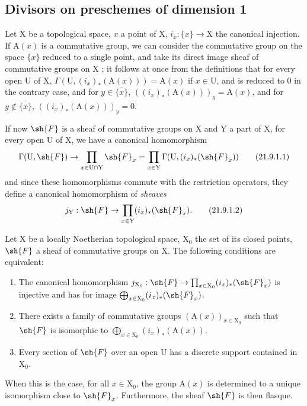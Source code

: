 \subsection{Divisors on preschemes of dimension 1}
\label{subsection:IV.21.9}

\begin{env}[21.9.1]
\label{IV.21.9.1}
Let $\mathrm{X}$ be a topological space, $x$ a point of $\mathrm{X}$, $i_x:\{x\}\to\mathrm{X}$ the canonical injection.
If $\mathrm{A}(x)$ is a commutative group, we can consider the commutative group on the space $\{x\}$ reduced to a single point, and take its direct image sheaf of commutative groups on $\mathrm{X}$ ;
it follows at once from the definitions that for every open $\mathrm{U}$ of $\mathrm{X}$, $\Gamma(\mathrm{U},(i_x)_*(\mathrm{A}(x)))=\mathrm{A}(x)$ if $x\in\mathrm{U}$, and is reduced to $0$ in the contrary case, and for $y\in\overline{\{x\}}$, $((i_x)_*(\mathrm{A}(x)))_y=\mathrm{A}(x)$, and for $y\notin\overline{\{x\}}$, $((i_x)_*(\mathrm{A}(x)))_y=0$.

If now $\sh{F}$ is a sheaf of commutative groups on $\mathrm{X}$ and $\mathrm{Y}$ a part of $\mathrm{X}$, for every open $\mathrm{U}$ of $\mathrm{X}$, we have a canonical homomorphism
\[
\label{IV.21.9.1.1}
  \Gamma(\mathrm{U},\sh{F})\to\prod_{x\in\mathrm{U}\cap\mathrm{Y}}\sh{F}_x=\prod_{x\in\mathrm{Y}}\Gamma(\mathrm{U},(i_x)_*(\sh{F}_x))
  \tag{21.9.1.1}
\]
and since these homomorphisms commute with the restriction operators, they define a canonical homomorphism of \emph{sheaves}
\[
\label{IV.21.9.1.2}
  j_\mathrm{Y}:\sh{F}\to\prod_{x\in\mathrm{Y}}(i_x)_*(\sh{F}_x).
  \tag{21.9.1.2}
\]
\end{env}

\begin{lemma}[21.9.2]
\label{IV.21.9.2}
Let $\mathrm{X}$ be a locally Noetherian topological space, $\mathrm{X}_0$ the set of its closed points, $\sh{F}$ a sheaf of commutative groups on $\mathrm{X}$.
The following conditions are equivalent:
\begin{enumerate}[label=\emph{\alph*)}]
  \item The canonical homomorphism $j_{\mathrm{X}_0}:\sh{F}\to\prod_{x\in\mathrm{X}_0}(i_x)_*(\sh{F}_x)$ is injective and has for image $\bigoplus_{x\in\mathrm{X}_0}(i_x)_*(\sh{F}_x)$.
  \item[\rm a$'$)] There exists a family of commutative groups $(\mathrm{A}(x))_{x\in\mathrm{X}_0}$ such that $\sh{F}$ is isomorphic to $\bigoplus_{x\in\mathrm{X}_0}(i_x)_*(\mathrm{A}(x))$.
  \item Every section of $\sh{F}$ over an open $\mathrm{U}$ has a discrete support contained in $\mathrm{X}_0$.
\end{enumerate}
When this is the case, for all $x\in\mathrm{X}_0$, the group $\mathrm{A}(x)$ is determined to a unique isomorphism close to $\sh{F}_x$.
Furthermore, the sheaf $\sh{F}$ is then flasque.
\end{lemma}

